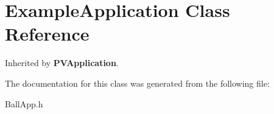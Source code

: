 \section{ExampleApplication Class Reference}
\label{class_example_application}
Inherited by {\bf PVApplication}.



The documentation for this class was generated from the following file:\begin{CompactItemize}
\item 
BallApp.h\end{CompactItemize}

